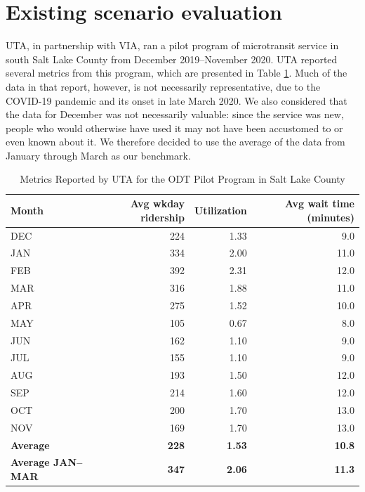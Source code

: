 \documentclass[
]{report}
\begin{document}
\hypertarget{existing-scenario-evaluation}{%
\section{Existing scenario evaluation}\label{existing-scenario-evaluation}}

UTA, in partnership with VIA, ran a pilot program of microtransit service in south Salt Lake County from December 2019--November 2020. UTA reported several metrics from this program, which are presented in Table \ref{tab:uta-metrics}. Much of the data in that report, however, is not necessarily representative, due to the COVID-19 pandemic and its onset in late March 2020. We also considered that the data for December was not necessarily valuable: since the service was new, people who would otherwise have used it may not have been accustomed to or even known about it. We therefore decided to use the average of the data from January through March as our benchmark.

\begin{table}

\caption{\label{tab:uta-metrics}Metrics Reported by UTA for the ODT Pilot Program in Salt Lake County}
\centering
\begin{tabular}[t]{lrrr}
\toprule
Month & Avg wkday ridership & Utilization & Avg wait time (minutes)\\
\midrule
DEC & 224 & 1.33 & 9.0\\
JAN & 334 & 2.00 & 11.0\\
FEB & 392 & 2.31 & 12.0\\
MAR & 316 & 1.88 & 11.0\\
APR & 275 & 1.52 & 10.0\\
MAY & 105 & 0.67 & 8.0\\
JUN & 162 & 1.10 & 9.0\\
JUL & 155 & 1.10 & 9.0\\
AUG & 193 & 1.50 & 12.0\\
SEP & 214 & 1.60 & 12.0\\
OCT & 200 & 1.70 & 13.0\\
NOV & 169 & 1.70 & 13.0\\
\textbf{Average} & \textbf{228} & \textbf{1.53} & \textbf{10.8}\\
\addlinespace
\textbf{Average JAN--MAR} & \textbf{347} & \textbf{2.06} & \textbf{11.3}\\
\bottomrule
\end{tabular}
\end{table}
\end{document}
